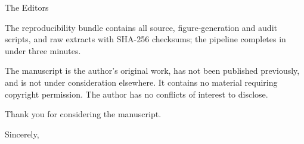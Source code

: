 \documentclass[11pt]{letter}
\begin{document}
\begin{letter}{The Editors}
\begin{enumerate}
\end{enumerate}

The reproducibility bundle contains all source, figure-generation and audit scripts, and raw extracts with SHA-256 checksums; the pipeline completes in under three minutes.

The manuscript is the author's original work, has not been published previously, and is not under consideration elsewhere. It contains no material requiring copyright permission. The author has no conflicts of interest to disclose.

Thank you for considering the manuscript.

\closing{Sincerely,}
\end{letter}
\end{document}

